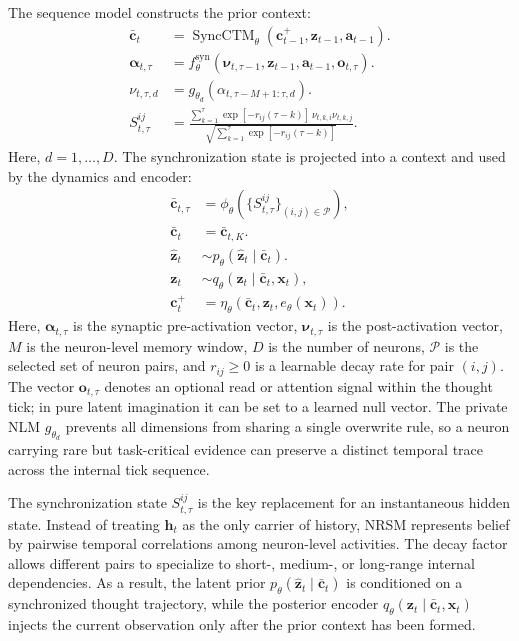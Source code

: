 \documentclass{article}
\begin{document}
The sequence model constructs the prior context:
\begin{align}
\bar{\mathbf c}_{t}
&= \operatorname{SyncCTM}_{\theta}(
\mathbf c^+_{t-1}, \mathbf z_{t-1}, \mathbf a_{t-1}).
\label{eq:ct_prior_context}\\
\boldsymbol{\alpha}_{t,\tau}
&= f_{\theta}^{\mathrm{syn}}(
\boldsymbol{\nu}_{t,\tau-1}, \mathbf z_{t-1},
\mathbf a_{t-1}, \mathbf o_{t,\tau}).
\label{eq:ct_synapse_tick}\\
\nu_{t,\tau,d}
&= g_{\theta_d}(\alpha_{t,\tau-M+1:\tau,d}).
\label{eq:ct_neuron_model}\\
S^{ij}_{t,\tau}
&=
\frac{\sum_{k=1}^{\tau}\exp[-r_{ij}(\tau-k)]\,\nu_{t,k,i}\nu_{t,k,j}}
{\sqrt{\sum_{k=1}^{\tau}\exp[-r_{ij}(\tau-k)]}}.
\label{eq:ct_sync_state}
\end{align}
Here, $d=1,\ldots,D$. The synchronization state is projected into a context and used by the dynamics and encoder:
\begin{align}
\bar{\mathbf c}_{t,\tau}
&= \phi_{\theta}(\{S^{ij}_{t,\tau}\}_{(i,j)\in\mathcal P}),\\
\bar{\mathbf c}_{t}
&= \bar{\mathbf c}_{t,K}.
\label{eq:ct_sync_context}\\
\hat{\mathbf z}_{t}
&\sim p_{\theta}(\hat{\mathbf z}_{t}\mid \bar{\mathbf c}_{t}).
\label{eq:ct_dynamics_predictor}\\
\mathbf z_t
&\sim q_{\theta}(\mathbf z_t\mid \bar{\mathbf c}_{t}, \mathbf x_t),\\
\mathbf c_t^+
&=\eta_{\theta}(\bar{\mathbf c}_{t}, \mathbf z_t, e_{\theta}(\mathbf x_t)).
\label{eq:ct_encoder}
\end{align}
Here, $\boldsymbol{\alpha}_{t,\tau}$ is the synaptic pre-activation vector, $\boldsymbol{\nu}_{t,\tau}$ is the post-activation vector, $M$ is the neuron-level memory window, $D$ is the number of neurons, $\mathcal P$ is the selected set of neuron pairs, and $r_{ij}\geq0$ is a learnable decay rate for pair $(i,j)$. The vector $\mathbf o_{t,\tau}$ denotes an optional read or attention signal within the thought tick; in pure latent imagination it can be set to a learned null vector. The private NLM $g_{\theta_d}$ prevents all dimensions from sharing a single overwrite rule, so a neuron carrying rare but task-critical evidence can preserve a distinct temporal trace across the internal tick sequence.

The synchronization state $S^{ij}_{t,\tau}$ is the key replacement for an instantaneous hidden state. Instead of treating $\mathbf h_t$ as the only carrier of history, NRSM represents belief by pairwise temporal correlations among neuron-level activities. The decay factor allows different pairs to specialize to short-, medium-, or long-range internal dependencies. As a result, the latent prior $p_{\theta}(\hat{\mathbf z}_t\mid\bar{\mathbf c}_t)$ is conditioned on a synchronized thought trajectory, while the posterior encoder $q_{\theta}(\mathbf z_t\mid\bar{\mathbf c}_t,\mathbf x_t)$ injects the current observation only after the prior context has been formed.
\end{document}
